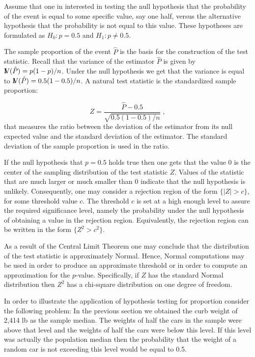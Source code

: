 \documentclass[]{krantz}
\newcommand{\Var}{{\rm I\kern-.3em V}}
\theoremstyle{definition}
\theoremstyle{definition}
\theoremstyle{definition}
\theoremstyle{remark}
\begin{document}
Assume that one in interested in testing the null hypothesis that the
probability of the event is equal to some specific value, say one half,
versus the alternative hypothesis that the probability is not equal to
this value. These hypotheses are formulated as \(H_0:p = 0.5\) and
\(H_1:p\not = 0.5\).

The sample proportion of the event \(\hat P\) is the basis for the
construction of the test statistic. Recall that the variance of the
estimator \(\hat P\) is given by \(\Var(\hat P) = p(1-p)/n\). Under the null
hypothesis we get that the variance is equal to
\(\Var(\hat P) = 0.5(1-0.5)/n\). A natural test statistic is the
standardized sample proportion:

\[Z = \frac{\hat P - 0.5}{\sqrt{0.5 (1-0.5)/n}}\;,\] that measures the
ratio between the deviation of the estimator from its null expected
value and the standard deviation of the estimator. The standard
deviation of the sample proportion is used in the ratio.

If the null hypothesis that \(p=0.5\) holds true then one gets that the
value 0 is the center of the sampling distribution of the test statistic
\(Z\). Values of the statistic that are much larger or much smaller than 0
indicate that the null hypothesis is unlikely. Consequently, one may
consider a rejection region of the form \(\{|Z| > c\}\), for some
threshold value \(c\). The threshold \(c\) is set at a high enough level to
assure the required significance level, namely the probability under the
null hypothesis of obtaining a value in the rejection region.
Equivalently, the rejection region can be written in the form
\(\{Z^2 > c^2\}\).

As a result of the Central Limit Theorem one may conclude that the
distribution of the test statistic is approximately Normal. Hence,
Normal computations may be used in order to produce an approximate
threshold or in order to compute an approximation for the \(p\)-value.
Specifically, if \(Z\) has the standard Normal distribution then \(Z^2\) has
a chi-square distribution on one degree of freedom.

In order to illustrate the application of hypothesis testing for
proportion consider the following problem: In the previous section we
obtained the curb weight of 2,414 lb as the sample median. The weights
of half the cars in the sample were above that level and the weights of
half the cars were below this level. If this level was actually the
population median then the probability that the weight of a random car
is not exceeding this level would be equal to 0.5.
\end{document}
